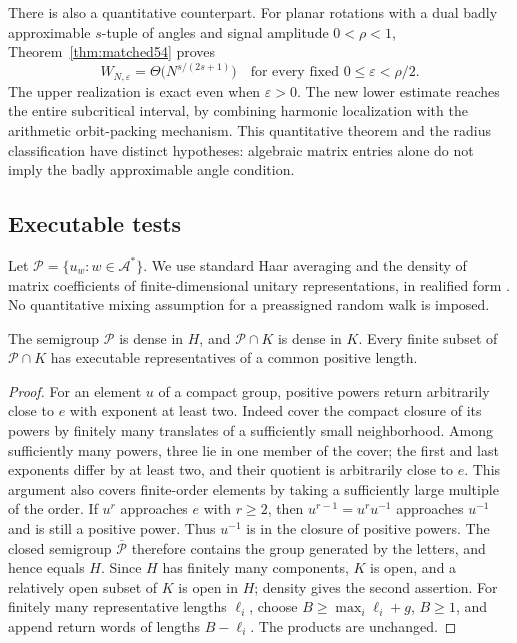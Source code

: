 There is also a quantitative counterpart. For planar rotations with a dual badly approximable $s$-tuple of angles and signal amplitude $0<\rho<1$, Theorem~\ref{thm:matched54} proves
\[
 W_{N,\varepsilon}=\Theta\bigl(N^{s/(2s+1)}\bigr)
 \quad\text{for every fixed }0\le\varepsilon<\rho/2.
\]
The upper realization is exact even when $\varepsilon>0$. The new lower estimate reaches the entire subcritical interval, by combining harmonic localization with the arithmetic orbit-packing mechanism. This quantitative theorem and the radius classification have distinct hypotheses: algebraic matrix entries alone do not imply the badly approximable angle condition.

\subsection{Executable tests}
Let $\mathcal P=\{u_w:w\in\mathcal A^*\}$. We use standard Haar averaging and the density of matrix coefficients of finite-dimensional unitary representations, in realified form \cite{Folland}. No quantitative mixing assumption for a preassigned random walk is imposed.

\begin{lemma}\label{lem:positive54}
The semigroup $\mathcal P$ is dense in $H$, and $\mathcal P\cap K$ is dense in $K$. Every finite subset of $\mathcal P\cap K$ has executable representatives of a common positive length.
\end{lemma}
\begin{proof}
For an element $u$ of a compact group, positive powers return arbitrarily close to $e$ with exponent at least two. Indeed cover the compact closure of its powers by finitely many translates of a sufficiently small neighborhood. Among sufficiently many powers, three lie in one member of the cover; the first and last exponents differ by at least two, and their quotient is arbitrarily close to $e$. This argument also covers finite-order elements by taking a sufficiently large multiple of the order. If $u^r$ approaches $e$ with $r\ge2$, then $u^{r-1}=u^ru^{-1}$ approaches $u^{-1}$ and is still a positive power. Thus $u^{-1}$ is in the closure of positive powers. The closed semigroup $\overline{\mathcal P}$ therefore contains the group generated by the letters, and hence equals $H$. Since $H$ has finitely many components, $K$ is open, and a relatively open subset of $K$ is open in $H$; density gives the second assertion. For finitely many representative lengths $\ell_i$, choose $B\ge\max_i\ell_i+g$, $B\ge1$, and append return words of lengths $B-\ell_i$. The products are unchanged.
\end{proof}

